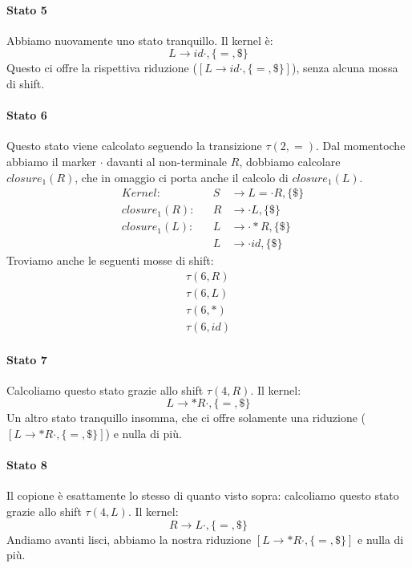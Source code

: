 \documentclass[class=book, crop=false, oneside, 12pt]{standalone}
\begin{document}
\paragraph{Stato 5}
Abbiamo nuovamente uno stato tranquillo. Il kernel è:
\begin{equation*}
    L \to id \cdot, \{=, \$\}
\end{equation*}
Questo ci offre la rispettiva riduzione (\([L \to id \cdot, \{=, \$\}]\)), senza alcuna mossa di shift.

\paragraph{Stato 6}
Questo stato viene calcolato seguendo la transizione \(\tau(2, =)\). Dal momentoche abbiamo il marker \(\cdot\) davanti al non-terminale \(R\), dobbiamo calcolare \(closure_1(R)\), che in omaggio ci porta anche il calcolo di \(closure_1(L)\).
\begin{align*}
    &&Kernel: &&S &\to L = \cdot R, \{\$\}& \\
    &&closure_1(R): &&R &\to \cdot L, \{\$\} &\\
    &&closure_1(L): &&L &\to \cdot \ast R, \{\$\}&\\
    && &&L &\to \cdot id,  \{\$\}&
\end{align*}
Troviamo anche le seguenti mosse di shift:
\begin{gather*}
    \tau(6, R) \\
    \tau(6, L) \\
    \tau(6, \ast) \\
    \tau(6, id)
\end{gather*}

\paragraph{Stato 7}
Calcoliamo questo stato grazie allo shift \(\tau(4, R)\). Il kernel:
\begin{equation*}
    L \to \ast R \cdot, \{=, \$\}
\end{equation*}
Un altro stato tranquillo insomma, che ci offre solamente una riduzione (\([L \to \ast R \cdot, \{=, \$\}]\)) e nulla di più. 

\paragraph{Stato 8}
Il copione è esattamente lo stesso di quanto visto sopra: calcoliamo questo stato grazie allo shift \(\tau(4, L)\). Il kernel:
\begin{equation*}
    R \to L \cdot, \{=, \$\}
\end{equation*}
Andiamo avanti lisci, abbiamo la nostra riduzione \([L \to \ast R \cdot, \{=, \$\}]\) e nulla di più.
\end{document}
